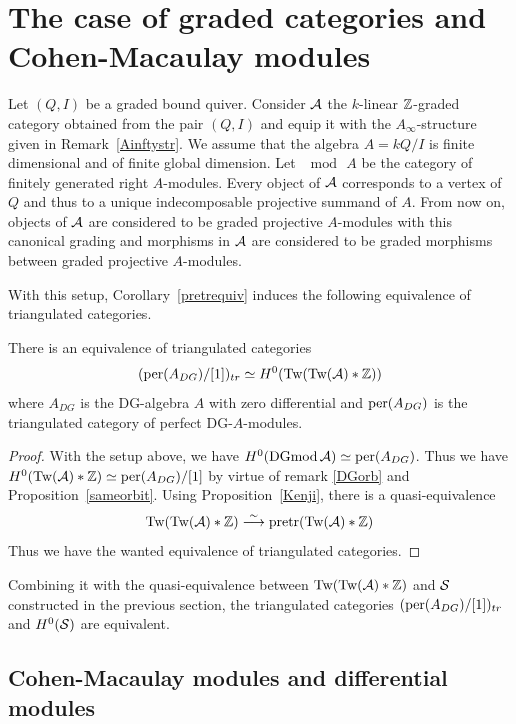 \documentclass[12pt]{article}
\begin{document}
	\section{The case of graded categories and Cohen-Macaulay modules}
	
	\label{sectionCM}
	
	Let $(Q,I)$ be a graded bound quiver. Consider ${\cal{A}}$ the $k$-linear $\mathbb{Z}$-graded category obtained from the pair $(Q,I)$ and equip it with the $A_\infty$-structure given in Remark~\ref{Ainftystr}. We assume that the algebra $A = kQ/I$ is finite dimensional and of finite global dimension. Let $\mod \, A$ be the category of finitely generated right $A$-modules. Every object of ${\cal{A}}$ corresponds to a vertex of $Q$ and thus to a unique indecomposable projective summand of $A$. From now on, objects of ${\cal{A}}$ are considered to be graded projective $A$-modules with this canonical grading and morphisms in ${\cal{A}}$ are considered to be graded morphisms between graded projective $A$-modules.
	
	\noindent With this setup, Corollary~\ref{pretrequiv} induces the following equivalence of triangulated categories.
	
	\begin{proposition}
		There is an equivalence of triangulated categories
		\[(\textup{per}(A_{DG})/[1])_{tr} \simeq H^0(\textup{Tw}(\textup{Tw}({\cal{A}})*\mathbb{Z}))\]
		where $A_{DG}$ is the DG-algebra $A$ with zero differential and $\textup{per}(A_{DG})$ is the triangulated category of perfect DG-$A$-modules.
	\end{proposition}
	
	\begin{proof}
		With the setup above, we have $H^0(\textup{DGmod} \, {\cal{A}}) \simeq \textup{per}(A_{DG})$. Thus we have $H^0(\textup{Tw}({\cal{A}}) * \mathbb{Z}) \simeq \textup{per}(A_{DG})/[1]$ by virtue of remark \ref{DGorb} and Proposition~\ref{sameorbit}. Using Proposition~\ref{Kenji}, there is a quasi-equivalence
		\[\textup{Tw}(\textup{Tw}({\cal{A}})* \mathbb{Z}) \overset{\sim}{\longrightarrow} \textup{pretr}(\textup{Tw}({\cal{A}}) * \mathbb{Z})\]
		Thus we have the wanted equivalence of triangulated categories. 
	\end{proof}
	
	Combining it with the quasi-equivalence between $\textup{Tw}(\textup{Tw}({\cal{A}}) * \mathbb{Z})$ and ${\cal{S}}$ constructed in the previous section, the triangulated categories $(\textup{per}(A_{DG})/[1])_{tr}$ and $H^0({\cal{S}})$ are equivalent. 
	
	\subsection{Cohen-Macaulay modules and differential modules}
	
\end{document}
